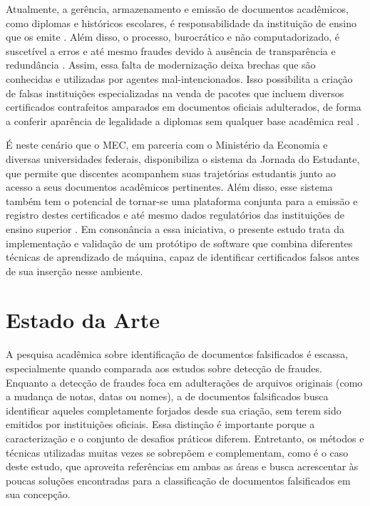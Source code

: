 \documentclass[12pt]{article}
\begin{document}
Atualmente, a gerência, armazenamento e emissão de documentos acadêmicos, como diplomas e históricos escolares, é responsabilidade da instituição de ensino que os emite \cite{mec:1978}. Além disso, o processo, burocrático e não computadorizado, é suscetível a erros e até mesmo fraudes devido à ausência de transparência e redundância \cite{palma:2019}. Assim, essa falta de modernização deixa brechas que são conhecidas e utilizadas por agentes mal-intencionados. Isso possibilita a criação de falsas instituições especializadas na venda de pacotes que incluem diversos certificados contrafeitos amparados em documentos oficiais adulterados, de forma a conferir aparência de legalidade a diplomas sem qualquer base acadêmica real \cite{dias:2022}.

É neste cenário que o MEC, em parceria com o Ministério da Economia e diversas universidades federais, disponibiliza o sistema da Jornada do Estudante, que permite que discentes acompanhem suas trajetórias estudantis junto ao acesso a seus documentos acadêmicos pertinentes. Além disso, esse sistema também tem o potencial de tornar-se uma plataforma conjunta para a emissão e registro destes certificados e até mesmo dados regulatórios das instituições de ensino superior \cite{rnp:2023}. Em consonância a essa iniciativa, o presente estudo trata da implementação e validação de um protótipo de software que combina diferentes técnicas de aprendizado de máquina, capaz de identificar certificados falsos antes de sua inserção nesse ambiente.

\section{Estado da Arte}

A pesquisa acadêmica sobre identificação de documentos falsificados é escassa, especialmente quando comparada aos estudos sobre detecção de fraudes. Enquanto a detecção de fraudes foca em adulterações de arquivos originais (como a mudança de notas, datas ou nomes), a de documentos falsificados busca identificar aqueles completamente forjados desde sua criação, sem terem sido emitidos por instituições oficiais. Essa distinção é importante porque a caracterização e o conjunto de desafios práticos diferem. Entretanto, os métodos e técnicas utilizadas muitas vezes se sobrepõem e complementam, como é o caso deste estudo, que aproveita referências em ambas as áreas e busca acrescentar às poucas soluções encontradas para a classificação de documentos falsificados em sua concepção.
\end{document}
